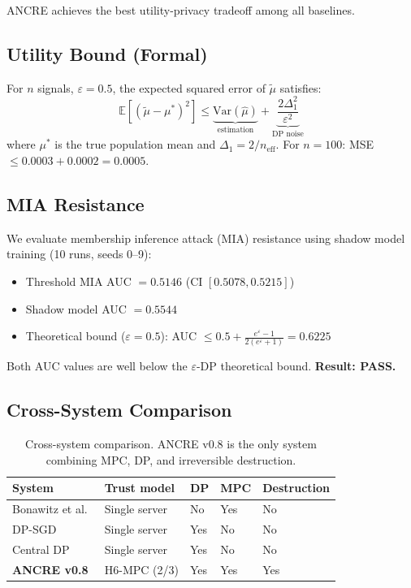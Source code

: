 \noindent ANCRE achieves the best
utility-privacy tradeoff among all baselines.

\subsection{Utility Bound (Formal)}

\begin{proposition}
For $n$ signals, $\varepsilon=0.5$,
the expected squared error of $\tilde{\mu}$
satisfies:
\[
\mathbb{E}[(\tilde{\mu} - \mu^*)^2]
\leq \underbrace{\mathrm{Var}(\hat{\mu})}_{\text{estimation}}
+ \underbrace{\frac{2\Delta_1^2}{\varepsilon^2}}_{\text{DP noise}}
\]
where $\mu^*$ is the true population mean
and $\Delta_1 = 2/n_{\mathrm{eff}}$.
For $n=100$: MSE $\leq 0.0003 + 0.0002 = 0.0005$.
\end{proposition}

\subsection{MIA Resistance}

We evaluate membership inference attack (MIA)
resistance using shadow model training
(10 runs, seeds 0--9):

\begin{itemize}
\item Threshold MIA AUC $= 0.5146$
      (CI $[0.5078, 0.5215]$)
\item Shadow model AUC $= 0.5544$
\item Theoretical bound ($\varepsilon=0.5$):
      AUC $\leq 0.5 + \frac{e^\varepsilon-1}
      {2(e^\varepsilon+1)} = 0.6225$
\end{itemize}

Both AUC values are well below the
$\varepsilon$-DP theoretical bound.
\textbf{Result: PASS.}

\subsection{Cross-System Comparison}

\begin{table}[h]
\centering
\begin{tabular}{lllll}
\toprule
System & Trust model & DP & MPC & Destruction \\
\midrule
Bonawitz et al.~\cite{Bonawitz2017}
  & Single server & No  & Yes & No  \\
DP-SGD~\cite{Abadi2016}
  & Single server & Yes & No  & No  \\
Central DP
  & Single server & Yes & No  & No  \\
\textbf{ANCRE v0.8}
  & H6-MPC (2/3) & Yes & Yes & Yes \\
\bottomrule
\end{tabular}
\caption{Cross-system comparison.
ANCRE v0.8 is the only system combining
MPC, DP, and irreversible destruction.}
\end{table}
